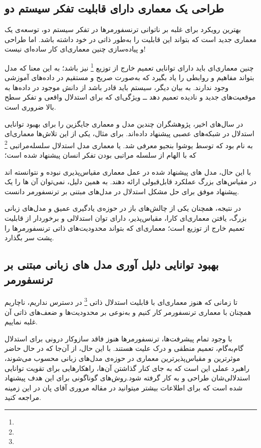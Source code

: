 \subsection{طراحی یک معماری دارای قابلیت تفکر سیستم دو}
بهترین رویکرد برای غلبه بر ناتوانی ترنسفورمرها در تفکر سیستم دو، توسعه‌ی یک معماری جدید است که بتواند این قابلیت را به‌طور ذاتی در خود داشته باشد.
اما طراحی و پیاده‌سازی چنین معماری‌ای کار ساده‌ای نیست!

چنین معماری‌ای باید دارای توانایی تعمیم خارج از توزیع
\footnote{}
نیز باشد؛ به این معنا که مدل بتواند مفاهیم و روابطی را یاد بگیرد که به‌صورت صریح و مستقیم در داده‌های آموزشی وجود ندارند. به بیان دیگر، سیستم باید قادر باشد از دانش موجود در داده‌ها به موقعیت‌های جدید و نادیده تعمیم دهد ــ ویژگی‌ای که برای استدلال واقعی و تفکر سطح بالا ضروری است.

در سال‌های اخیر، پژوهشگران چندین مدل و معماری جایگزین را برای بهبود توانایی استدلال در شبکه‌های عصبی پیشنهاد داده‌اند. برای مثال، یکی از این تلاش‌ها معماری‌ای به نام
\cite{b27}
بود که توسط یوشوا بنجیو معرفی شد. یا معماری مدل استدلال سلسله‌مراتبی
\footnote{}
\cite{b28}
که با الهام از سلسله مراتبی بودن تفکر انسان پیشنهاد شده است؛

با این حال،
مدل های پیشنهاد شده
در عمل معماری مقیاس‌پذیری نبوده و نتوانسته اند در مقیاس‌های بزرگ عملکرد قابل‌قبولی ارائه دهند. به همین دلیل، نمی‌توان آن ها را یک پیشنهاد موفق برای حل مشکل استدلال در مدل‌های مبتنی بر ترنسفورمر دانست.

در نتیجه، همچنان یکی از چالش‌های باز در حوزه‌ی یادگیری عمیق و مدل‌های زبانی بزرگ، یافتن معماری‌ای کارا، مقیاس‌پذیر، دارای توان استدلالی و برخوردار از قابلیت تعمیم خارج از توزیع است؛ معماری‌ای که بتواند محدودیت‌های ذاتی ترنسفورمرها را پشت سر بگذارد.

\subsection{
بهبود توانایی دلیل آوری مدل های زبانی مبتنی بر ترنسفورمر
}
تا زمانی که هنوز معماری‌ای با قابلیت استدلال ذاتی
\footnote{}
در دسترس نداریم، ناچاریم همچنان با معماری ترنسفورمر کار کنیم و به‌نوعی بر محدودیت‌ها و ضعف‌های ذاتی آن غلبه نماییم.

با وجود تمام پیشرفت‌ها، ترنسفورمرها هنوز فاقد سازوکار درونی برای استدلال گام‌به‌گام، تعمیم منطقی و درک علیت هستند. با این حال، از آن‌جا که در حال حاضر موثرترین و مقیاس‌پذیرترین معماری در حوزه‌ی مدل‌های زبانی محسوب می‌شوند، راهبرد عملی این است که به جای کنار گذاشتن آن‌ها، راهکارهایی برای تقویت توانایی استدلالی‌شان طراحی و به کار گرفته شود.روش‌های گوناگونی برای این هدف پیشنهاد شده است که برای اطلاعات بیشتر میتوانید در مقاله مروری آقای پان
\cite{b29}
در این زمینه مراجعه کنید.

